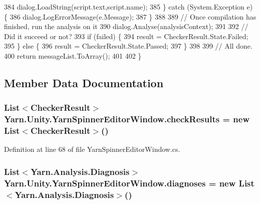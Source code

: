 \begin{DoxyCode}
384                 dialog.LoadString(script.text,script.name);
385             \} \textcolor{keywordflow}{catch} (System.Exception e) \{
386                 dialog.LogErrorMessage(e.Message);
387             \}
388 
389             \textcolor{comment}{// Once compilation has finished, run the analysis on it}
390             dialog.Analyse(analysisContext);
391 
392             \textcolor{comment}{// Did it succeed or not?}
393             \textcolor{keywordflow}{if} (failed) \{
394                 result = CheckerResult.State.Failed;
395             \} \textcolor{keywordflow}{else} \{
396                 result = CheckerResult.State.Passed;
397             \}
398 
399             \textcolor{comment}{// All done.}
400             \textcolor{keywordflow}{return} messageList.ToArray();
401 
402         \}
\end{DoxyCode}


\subsection{Member Data Documentation}
\hypertarget{a00164_aa85ab7bd194e5425b991b9c216d4d10e}{
\subsubsection[{check\-Results}]{\setlength{\rightskip}{0pt plus 5cm}List$<${\bf Checker\-Result}$>$ Yarn.\-Unity.\-Yarn\-Spinner\-Editor\-Window.\-check\-Results = new List$<${\bf Checker\-Result}$>$()\hspace{0.3cm}{\ttfamily [private]}}}\label{a00164_aa85ab7bd194e5425b991b9c216d4d10e}


Definition at line 68 of file Yarn\-Spinner\-Editor\-Window.\-cs.

\hypertarget{a00164_a25c92cbfdd09661a96714d05b14af886}{
\subsubsection[{diagnoses}]{\setlength{\rightskip}{0pt plus 5cm}List$<${\bf Yarn.\-Analysis.\-Diagnosis}$>$ Yarn.\-Unity.\-Yarn\-Spinner\-Editor\-Window.\-diagnoses = new List$<${\bf Yarn.\-Analysis.\-Diagnosis}$>$()\hspace{0.3cm}{\ttfamily [private]}}}\label{a00164_a25c92cbfdd09661a96714d05b14af886}


